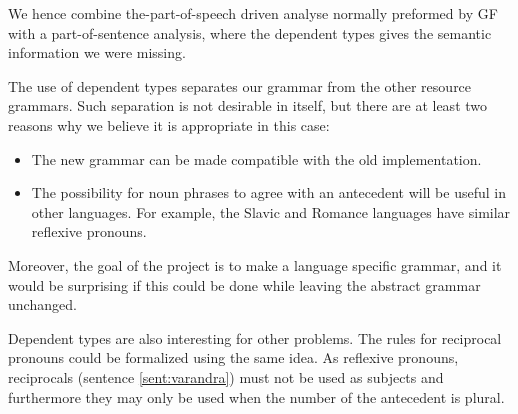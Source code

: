 \documentclass{report}
\begin{document}
We hence combine the-part-of-speech driven analyse normally preformed by
GF with a part-of-sentence analysis, where the dependent types gives the semantic
information we were missing.

The use of dependent types separates our grammar from the other resource grammars. Such separation
is not desirable in itself, but there are at least two reasons why we
believe it is appropriate in this case:
\begin{itemize}
\item The new grammar can be made compatible with the old implementation.
\item The possibility for noun phrases to agree with an antecedent 
      will be useful in other languages. For example, the Slavic and Romance languages
      have similar reflexive pronouns.
\end{itemize}
Moreover, the goal of the project is to make a language specific grammar, and it
would be surprising if this could be done while leaving the abstract grammar unchanged.

Dependent types are also interesting for other problems.
The rules for reciprocal pronouns could be formalized using the same idea. As
reflexive pronouns, reciprocals (sentence \ref{sent:varandra})
must not be used as subjects and furthermore they may only be used when the
number of the antecedent is plural.
\label{sent:varandra}
%
%
%
\end{document}
